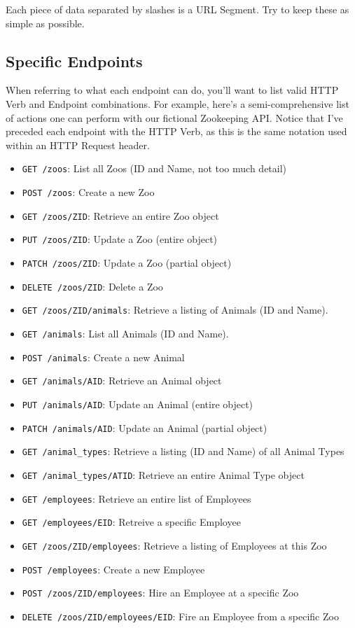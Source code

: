 \documentclass{book}
\begin{document}
Each piece of data separated by slashes is a URL Segment. Try to keep these as simple as possible.

\subsection{Specific Endpoints}

When referring to what each endpoint can do, you'll want to list valid HTTP Verb and Endpoint combinations. For example, here's a semi-comprehensive list of actions one can perform with our fictional Zookeeping API. Notice that I've preceded each endpoint with the HTTP Verb, as this is the same notation used within an HTTP Request header.

\begin{itemize}
\item \texttt{GET /zoos}: List all Zoos (ID and Name, not too much detail)
\item \texttt{POST /zoos}: Create a new Zoo
\item \texttt{GET /zoos/ZID}: Retrieve an entire Zoo object
\item \texttt{PUT /zoos/ZID}: Update a Zoo (entire object)
\item \texttt{PATCH /zoos/ZID}: Update a Zoo (partial object)
\item \texttt{DELETE /zoos/ZID}: Delete a Zoo
\item \texttt{GET /zoos/ZID/animals}: Retrieve a listing of Animals (ID and Name).
\item \texttt{GET /animals}: List all Animals (ID and Name).
\item \texttt{POST /animals}: Create a new Animal
\item \texttt{GET /animals/AID}: Retrieve an Animal object
\item \texttt{PUT /animals/AID}: Update an Animal (entire object)
\item \texttt{PATCH /animals/AID}: Update an Animal (partial object)
\item \texttt{GET /animal\_types}: Retrieve a listing (ID and Name) of all Animal Types
\item \texttt{GET /animal\_types/ATID}: Retrieve an entire Animal Type object
\item \texttt{GET /employees}: Retrieve an entire list of Employees
\item \texttt{GET /employees/EID}: Retreive a specific Employee
\item \texttt{GET /zoos/ZID/employees}: Retrieve a listing of Employees at this Zoo
\item \texttt{POST /employees}: Create a new Employee
\item \texttt{POST /zoos/ZID/employees}: Hire an Employee at a specific Zoo
\item \texttt{DELETE /zoos/ZID/employees/EID}: Fire an Employee from a specific Zoo
\end{itemize}
\end{document}
